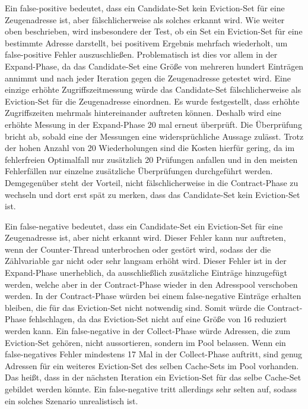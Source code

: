 Ein false-positive bedeutet, dass ein Candidate-Set kein Eviction-Set für eine Zeugenadresse ist, aber fälschlicherweise als solches erkannt wird.
Wie weiter oben beschrieben, wird insbesondere der Test, ob ein Set ein Eviction-Set für eine bestimmte Adresse darstellt, bei positivem Ergebnis mehrfach wiederholt, um false-positive Fehler auszuschließen. 
Problematisch ist dies vor allem in der Expand-Phase, da das Candidate-Set eine Größe von mehreren hundert Einträgen annimmt und nach jeder Iteration gegen die Zeugenadresse getestet wird. 
Eine einzige erhöhte Zugriffszeitmessung würde das Candidate-Set fälschlicherweise als Eviction-Set für die Zeugenadresse einordnen. 
Es wurde festgestellt, dass erhöhte Zugriffszeiten mehrmals hintereinander auftreten können. Deshalb wird eine erhöhte Messung in der Expand-Phase 20 mal erneut überprüft. 
Die Überprüfung bricht ab, sobald eine der Messungen eine widersprüchliche Aussage zulässt.
Trotz der hohen Anzahl von 20 Wiederholungen sind die Kosten hierfür gering, da im fehlerfreien Optimalfall nur zusätzlich 20 Prüfungen anfallen und in den meisten Fehlerfällen nur einzelne zusätzliche Überprüfungen durchgeführt werden. 
Demgegenüber steht der Vorteil, nicht fälschlicherweise in die Contract-Phase zu wechseln und dort erst spät zu merken, dass das Candidate-Set kein Eviction-Set ist.

Ein false-negative bedeutet, dass ein Candidate-Set ein Eviction-Set für eine Zeugenadresse ist, aber nicht erkannt wird.
Dieser Fehler kann nur auftreten, wenn der Counter-Thread unterbrochen oder gestört wird, sodass der die Zählvariable gar nicht oder sehr langsam erhöht wird.
Dieser Fehler ist in der Expand-Phase unerheblich, da ausschließlich zusätzliche Einträge hinzugefügt werden, welche aber in der Contract-Phase wieder in den Adresspool verschoben werden.
In der Contract-Phase würden bei einem false-negative Einträge erhalten bleiben, die für das Eviction-Set nicht notwendig sind. Somit würde die Contract-Phase fehlschlagen, da das Eviction-Set nicht auf eine Größe von 16 reduziert werden kann.
Ein false-negative in der Collect-Phase würde Adressen, die zum Eviction-Set gehören, nicht aussortieren, sondern im Pool belassen.
Wenn ein false-negatives Fehler mindestens 17 Mal in der Collect-Phase auftritt, sind genug Adressen für ein weiteres Eviction-Set des selben Cache-Sets im Pool vorhanden. Das heißt, dass in der nächsten Iteration ein Eviction-Set für das selbe Cache-Set gebildet werden könnte.
Ein false-negative tritt allerdings sehr selten auf, sodass ein solches Szenario unrealistisch ist.

